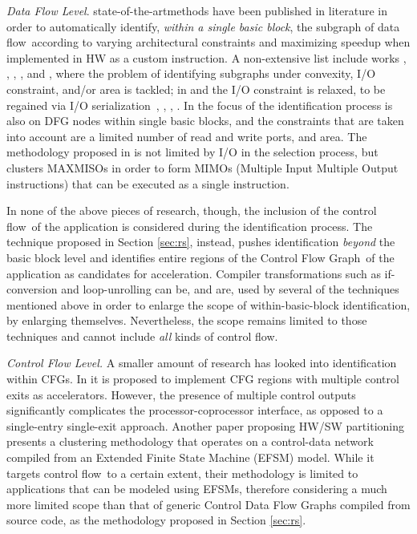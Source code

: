 \documentclass[]{usiinfthesis}
\newcommand{\SoTA}{{state-of-the-art}}
\newcommand{\dataflow}{data flow}
\newcommand{\controlflow}{control flow}
\newcommand{\CFG}{Control Flow Graph}
\begin{document}
\emph{Data Flow Level}.
\SoTA methods have been
published in literature in order to automatically identify,
\emph{within a single basic block}, the subgraph of \dataflow\ 
according to varying architectural constraints and maximizing speedup
when implemented in HW as a custom instruction. A non-extensive list
include works \cite{YuSep04}, \cite{PozziJul06}, \cite{ChenFeb07},
\cite{ReddingtonAug09}, \cite{GiaquintaMar15} and \cite{MartiFeb12},
where the problem of identifying subgraphs under convexity, I/O
constraint, and/or area is tackled; in \cite{VermaOct07} and
\cite{PothineniJan07} the I/O constraint is relaxed, to be regained
via I/O serialization~\cite{PozziSep05}, \cite{VermaOct07},
\cite{AtasuApr07}, \cite{AhnJan13}. In \cite{CongFeb04} the focus of
the identification process is also on DFG nodes within single basic
blocks, and the constraints that are taken into account are a limited
number of read and write ports, and area.  The methodology proposed in
\cite{GaluzziOct06} is not limited by I/O in the selection process,
but clusters MAXMISOs \cite{AlippiMar99} in order to form MIMOs 
(Multiple Input Multiple Output instructions) that can be executed as 
a single instruction.\par

In none of the above pieces of research, though, the inclusion of the
\controlflow\ of the application is considered during the
identification process. The technique proposed in Section \ref{sec:rs}, 
instead, pushes 
identification \emph{beyond} the basic block level and identifies 
entire regions of the \CFG\ of the
application as candidates for acceleration. Compiler
transformations such as if-conversion and loop-unrolling can be, and
are, used by several of the techniques mentioned above in order to
enlarge the scope of within-basic-block identification, by enlarging 
themselves. Nevertheless, the scope remains limited to those
techniques and cannot include \emph{all} kinds of
\controlflow.\par

\emph{Control Flow Level.}
A smaller amount of research has looked into
identification within CFGs. In \cite{ZuluagaJul09} it is
proposed to implement CFG regions with multiple control exits as
accelerators. However, the presence of multiple control outputs
significantly complicates the processor-coprocessor interface, as
opposed to a single-entry single-exit approach. 
Another paper proposing HW/SW partitioning~\cite{BaleaniMay02}
presents a clustering methodology that operates on a control-data
network compiled from an Extended Finite State Machine (EFSM)
model. While it targets \controlflow\ to a certain extent, their
methodology is limited to applications that can be modeled using
EFSMs, therefore considering a much more limited scope than that of
generic Control Data Flow Graphs compiled from source code, as the methodology
proposed in Section \ref{sec:rs}.
\end{document}
